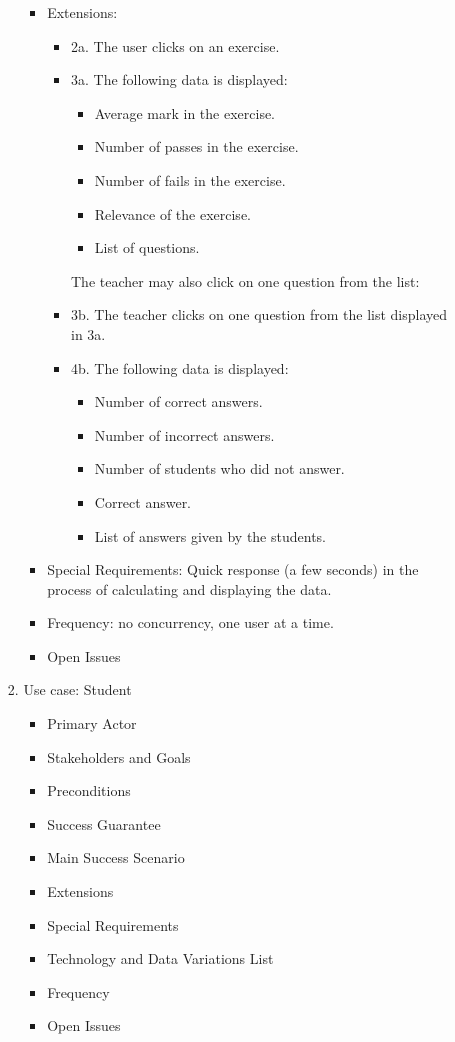 \documentclass{article}
\begin{document}
\begin{enumerate}
\begin{enumerate}
\begin{enumerate}
\begin{itemize}
\begin{itemize}
					\end{itemize}
				\item Extensions: 
					\begin{itemize}
						\item 2a. The user clicks on an exercise.
						\item 3a. The following data is displayed:
							\begin{itemize}
								\item Average mark in the exercise.
								\item Number of passes in the exercise.
								\item Number of fails in the exercise.
								\item Relevance of the exercise.
								\item List of questions.
							\end{itemize}
						The teacher may also click on one question from the list: \\
							\item 3b. The teacher clicks on one question from the list displayed in 3a.
							\item 4b. The following data is displayed:
								\begin{itemize}
									\item Number of correct answers.
									\item Number of incorrect answers.
									\item Number of students who did not answer.
									\item Correct answer.
									\item List of answers given by the students.
								\end{itemize}
					\end{itemize}
				\item Special Requirements: Quick response (a few seconds) in the process of calculating and displaying the data.
				\item Frequency: no concurrency, one user at a time.
				\item Open Issues
			\end{itemize}
			\item{Use case: Student}
			
			
			
			\begin{itemize}
				\item Primary Actor
				\item Stakeholders and Goals
				\item Preconditions
				\item Success Guarantee
				\item Main Success Scenario
				\item Extensions
				\item Special Requirements
				\item Technology and Data Variations List
				\item Frequency
				\item Open Issues
				

\end{itemize}
\end{enumerate}
\end{enumerate}
\end{enumerate}
\end{document}
